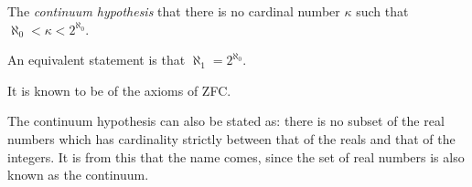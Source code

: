 \documentclass{article}
\begin{document}
The \emph{continuum hypothesis}  that there is no cardinal number $\kappa$ such that $\aleph_0<\kappa <2^{\aleph_0}$.

An equivalent statement is that $\aleph_1 =2^{\aleph_0}$.

It is known to be  of the axioms of ZFC.

The continuum hypothesis can also be stated as:  there is no subset of the real numbers which has cardinality strictly between that of the reals and that of the integers.  It is from this that the name comes, since the set of real numbers is also known as the continuum.
\end{document}
